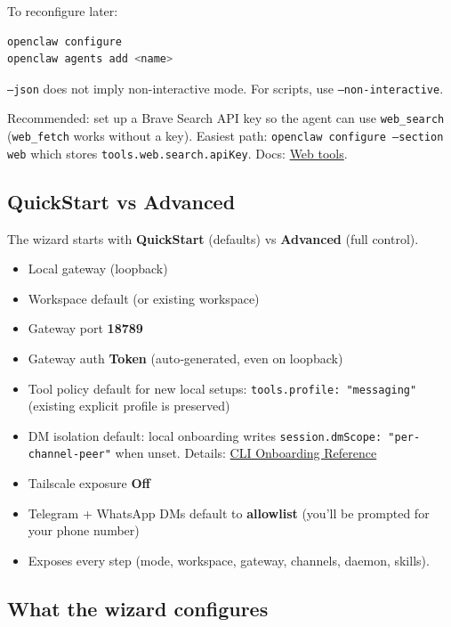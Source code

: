 To reconfigure later:

\begin{lstlisting}[language=bash]
openclaw configure
openclaw agents add <name>
\end{lstlisting}


\texttt{--json} does not imply non-interactive mode. For scripts, use \texttt{--non-interactive}.

Recommended: set up a Brave Search API key so the agent can use \texttt{web\_search}
(\texttt{web\_fetch} works without a key). Easiest path: \texttt{openclaw configure --section web}
which stores \texttt{tools.web.search.apiKey}. Docs: \href{/tools/web}{Web tools}.

\subsection{QuickStart vs Advanced}


The wizard starts with \textbf{QuickStart} (defaults) vs \textbf{Advanced} (full control).

\begin{itemize}
  \item Local gateway (loopback)
  \item Workspace default (or existing workspace)
  \item Gateway port \textbf{18789}
  \item Gateway auth \textbf{Token} (auto‑generated, even on loopback)
  \item Tool policy default for new local setups: \texttt{tools.profile: "messaging"} (existing explicit profile is preserved)
  \item DM isolation default: local onboarding writes \texttt{session.dmScope: "per-channel-peer"} when unset. Details: \href{/start/wizard-cli-reference\#outputs-and-internals}{CLI Onboarding Reference}
  \item Tailscale exposure \textbf{Off}
  \item Telegram + WhatsApp DMs default to \textbf{allowlist} (you'll be prompted for your phone number)
\end{itemize}

\begin{itemize}
  \item Exposes every step (mode, workspace, gateway, channels, daemon, skills).
\end{itemize}


\subsection{What the wizard configures}



